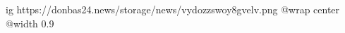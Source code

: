  
 
 
 
 

\ifcmt
  ig https://donbas24.news/storage/news/vydozzswoy8gvelv.png
  @wrap center
  @width 0.9
\fi
